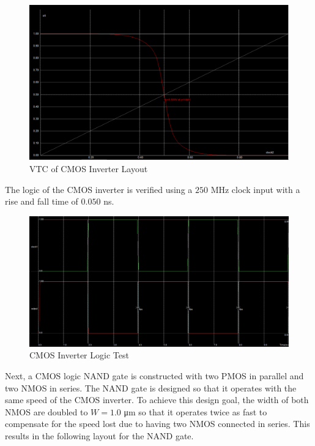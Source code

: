 \begin{figure}[h!]
	\centering
	\includegraphics[scale=0.30]{../images/inverter_layout_vtc.PNG}
	\caption{VTC of CMOS Inverter Layout}
	\label{fig:inverter_layout_vtc}
\end{figure}

\FloatBarrier

The logic of the CMOS inverter is verified using a $250$ \si{\mega\hertz} clock input with a rise and fall time of $0.050$ \si{\nano\second}.

\FloatBarrier

\begin{figure}[h!]
	\centering
	\includegraphics[scale=0.30]{../images/inverter_logic_test.PNG}
	\caption{CMOS Inverter Logic Test}
	\label{fig:inverter_layout_logic}
\end{figure}

\FloatBarrier

Next, a CMOS logic NAND gate is constructed with two PMOS in parallel and two NMOS in series.
The NAND gate is designed so that it operates with the same speed of the CMOS inverter.
To achieve this design goal, the width of both NMOS are doubled to $W = 1.0$ \si{\micro\meter} so that it operates twice as fast to compensate for the speed lost due to having two NMOS connected in series.
This results in the following layout for the NAND gate.

